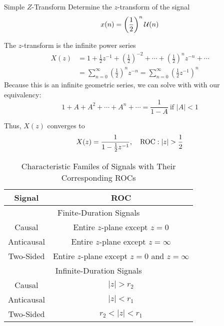 \begin{example}[]{Simple $Z$-Transform}
  Determine the $z$-transform of the signal
  \begin{equation*}
    x(n) = \left( \frac{1}{2} \right)^{n} \operatorname{\mathcal{U}}(n)
  \end{equation*}

  \tcblower

  The $z$-transform is the infinite power series
  \begin{equation*}
    \begin{aligned}
      X(z) &= 1 + \frac{1}{2}z^{-1} + {\left( \frac{1}{2} \right)}^{-2} + \cdots + {\left( \frac{1}{2} \right)}^{n}z^{-n} + \cdots \\
      &= \sum_{n=0}^{\infty} {\left( \frac{1}{2} \right)}^{n}z^{-n} = \sum_{n=0}^{\infty} {\left( \frac{1}{2}z^{-1} \right)}^{n}
    \end{aligned}
  \end{equation*}
  Because this is an infinite geometric series, we can solve with with our equivalency:
  \begin{equation*}
    1 + A + A^{2} + \cdots + A^{n} + \cdots = \frac{1}{1-A} \> \text{if } \lvert A \rvert < 1
  \end{equation*}

  Thus, $X(z)$ converges to
  \begin{equation*}
    X(z) = \frac{1}{1-\frac{1}{2}z^{-1}}, \quad \operatorname{\mathrm{ROC}}: \lvert z \rvert > \frac{1}{2}
  \end{equation*}
\end{example}

\begin{table}[h!]
  \centering
  \begin{tabular}{cc}
    \toprule
    Signal & ROC \\
    \midrule
    \multicolumn{2}{c}{Finite-Duration Signals} \\
    \midrule
    Causal & Entire $z$-plane except $z=0$ \\
    Anticausal & Entire $z$-plane except $z=\infty$ \\
    Two-Sided & Entire $z$-plane except $z=0$ and $z=\infty$ \\
    \midrule
    \multicolumn{2}{c}{Infinite-Duration Signals} \\
    \midrule
    Causal & $\lvert z \rvert > r_{2}$ \\
    Anticausal & $\lvert z \rvert < r_{1}$ \\
    Two-Sided & $r_{2} < \lvert z \rvert < r_{1}$ \\
    \bottomrule
  \end{tabular}
  \caption{Characteristic Familes of Signals with Their Corresponding ROCs}
  \label{tab:Z-Transform ROC Correspondence}
\end{table}

